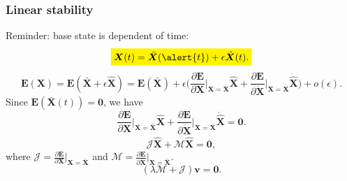 \documentclass{beamer}
\begin{document}
\begin{frame}
	\frametitle{Linear stability}
	\begin{overlayarea}{\textwidth}{\textheight}\vspace{-0.3cm}
		Reminder: base state is dependent of time:
		\begin{equation*}
			\colorbox{yellow}{$\bm{X}(t)=\bar{\bm{X}}(\alert{t})+\epsilon \hat{\bm{X}}(t)$.}
		\end{equation*}
		\begin{equation*}
			\bm{E}(\bm{X})=\bm{E}(\bar{\bm{X}}+\epsilon \hat{\bm{X}})=\bm{E}(\bar{\bm{X}})+\epsilon \Big(\frac{\partial \bm{E}}{\partial \bm{X}}\Big|_{\bm{X}=\bar{\bm{X}}}\hat{\bm{X}}+\frac{\partial \bm{E}}{\partial \dot{\bm{X}}}\Big|_{\bm{X}=\bar{\bm{X}}}\dot{\hat{\bm{X}}}\Big)+o(\epsilon).
		\end{equation*}
		Since $\bm{E}(\bar{\bm{X}}(t))=\bm{0}$, we have 
		\begin{equation*}
			\frac{\partial \bm{E}}{\partial \bm{X}}\Big|_{\bm{X}=\bar{\bm{X}}}\hat{\bm{X}}+\frac{\partial \bm{E}}{\partial \dot{\bm{X}}}\Big|_{\bm{X}=\bar{\bm{X}}}\dot{\hat{\bm{X}}}=\bm{0}.
		\end{equation*}
		\begin{equation*}
			\bm{\mathcal{J}}\hat{\bm{X}}+\bm{\mathcal{M}}\dot{\hat{\bm{X}}}=\bm{0},
		\end{equation*}
		where $\bm{\mathcal{J}}=\frac{\partial \bm{E}}{\partial \bm{X}}\Big|_{\bm{X}=\bar{\bm{X}}}$ and $\bm{\mathcal{M}}=\frac{\partial \bm{E}}{\partial \dot{\bm{X}}}\Big|_{\bm{X}=\bar{\bm{X}}}$.
		\begin{equation*}
			(\lambda\bm{\mathcal{M}}+\bm{\mathcal{J}})\bm{v}=\bm{0}.
		\end{equation*}
	\end{overlayarea}
\end{frame}

\end{document}
